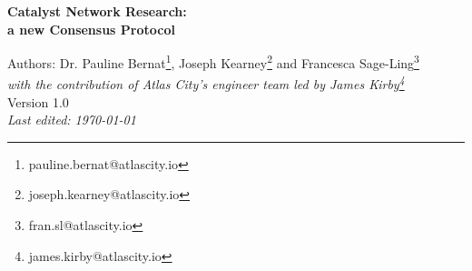 \documentclass[a4paper, 12pt]{book}
\begin{document}
\begin{titlepage}

\par
{}%
\hfill
{}%
\par

\begin{center}
\vspace*{4cm}
\LARGE
\textbf{Catalyst Network Research:\\
a new Consensus Protocol}

\large
\vspace{1.5cm}
\renewcommand{\thefootnote}{\fnsymbol{footnote}}
Authors: Dr. Pauline Bernat\footnote{pauline.bernat@atlascity.io}, Joseph Kearney\footnote{joseph.kearney@atlascity.io} and Francesca Sage-Ling\footnote{fran.sl@atlascity.io}\\
\small
\vspace{.5cm}
\textit{with the contribution of Atlas City's engineer team led by James Kirby\footnote{james.kirby@atlascity.io}}\\
\vspace{1.5cm}
Version 1.0
 \\
\vspace{0.5cm}
\textit{Last edited: \today}
\end{center}
\end{titlepage}
%



\renewcommand{\thefootnote}{\arabic{footnote}}
\end{document}
